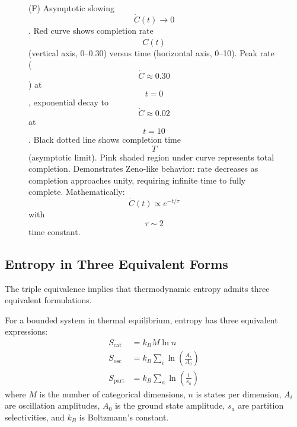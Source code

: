 \begin{figure}[htbp]
{    (F) Asymptotic slowing $$\dot{C}(t) \to 0$$. Red curve shows completion rate $$\dot{C}(t)$$ (vertical axis, 0--0.30) versus time (horizontal axis, 0--10). Peak rate ($$\dot{C} \approx 0.30$$) at $$t = 0$$, exponential decay to $$\dot{C} \approx 0.02$$ at $$t = 10$$. Black dotted line shows completion time $$T$$ (asymptotic limit). Pink shaded region under curve represents total completion. Demonstrates Zeno-like behavior: rate decreases as completion approaches unity, requiring infinite time to fully complete. Mathematically: $$\dot{C}(t) \propto e^{-t/\tau}$$ with $$\tau \sim 2$$ time constant.}
    \label{fig:topology_categorical_spaces}
    \end{figure}

\subsection{Entropy in Three Equivalent Forms}

The triple equivalence implies that thermodynamic entropy admits three equivalent formulations.

\begin{theorem}
\label{thm:entropy}
For a bounded system in thermal equilibrium, entropy has three equivalent expressions:
\begin{align}
S_{\text{cat}} &= k_B M \ln n \label{eq:entropy_cat} \\
S_{\text{osc}} &= k_B \sum_i \ln\left(\frac{A_i}{A_0}\right) \label{eq:entropy_osc} \\
S_{\text{part}} &= k_B \sum_a \ln\left(\frac{1}{s_a}\right) \label{eq:entropy_part}
\end{align}
where $M$ is the number of categorical dimensions, $n$ is states per dimension, $A_i$ are oscillation amplitudes, $A_0$ is the ground state amplitude, $s_a$ are partition selectivities, and $k_B$ is Boltzmann's constant.
\end{theorem}

